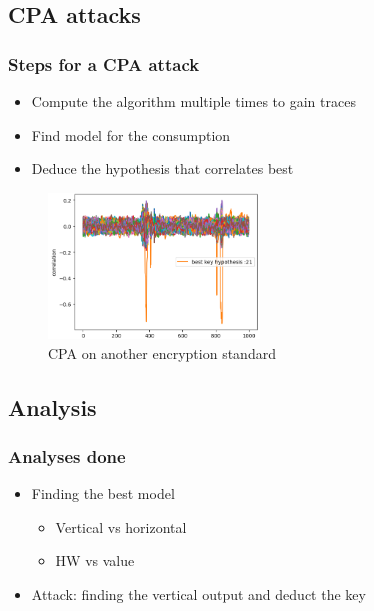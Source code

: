 \documentclass{beamer}
\begin{document}
	\subsection{CPA attacks}
	\begin{frame}
		\frametitle{Steps for a CPA attack}
		\begin{itemize}
			\item Compute the algorithm multiple times to gain traces
			\item Find model for the consumption
			\item Deduce the hypothesis that correlates best
		\end{itemize}
		\begin{figure}[H]
			\includegraphics[width=0.5\textwidth]{img_files/corr_aes}
			\caption{CPA on another encryption standard}
		\end{figure}
	\end{frame}

	\subsection{Analysis}
	\begin{frame}
		\frametitle{Analyses done}
		\begin{itemize}
			\item{Finding the best model}
				\begin{itemize}
					\item{Vertical vs horizontal}
					\item{HW vs value}
				\end{itemize}
			\item{Attack: finding the vertical output and deduct the key}
		\end{itemize}
	\end{frame}
	
	
\end{document}
